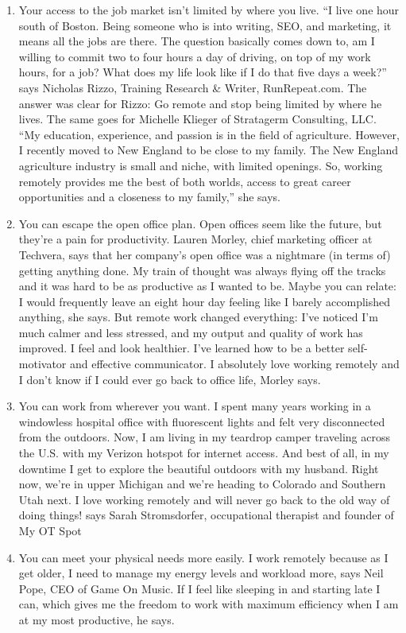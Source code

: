 \documentclass[]{book}
\begin{document}
\begin{enumerate}
\item
  Your access to the job market isn't limited by where you live. ``I live one hour south of Boston. Being someone who is into writing, SEO, and marketing, it means all the jobs are there. The question basically comes down to, am I willing to commit two to four hours a day of driving, on top of my work hours, for a job? What does my life look like if I do that five days a week?'' says Nicholas Rizzo, Training Research \& Writer, RunRepeat.com. The answer was clear for Rizzo: Go remote and stop being limited by where he lives. The same goes for Michelle Klieger of Stratagerm Consulting, LLC. ``My education, experience, and passion is in the field of agriculture. However, I recently moved to New England to be close to my family. The New England agriculture industry is small and niche, with limited openings. So, working remotely provides me the best of both worlds, access to great career opportunities and a closeness to my family,'' she says.
\item
  You can escape the open office plan. Open offices seem like the future, but they're a pain for productivity. Lauren Morley, chief marketing officer at Techvera, says that her company's open office was a nightmare (in terms of) getting anything done. My train of thought was always flying off the tracks and it was hard to be as productive as I wanted to be. Maybe you can relate: I would frequently leave an eight hour day feeling like I barely accomplished anything, she says. But remote work changed everything: I've noticed I'm much calmer and less stressed, and my output and quality of work has improved. I feel and look healthier. I've learned how to be a better self-motivator and effective communicator. I absolutely love working remotely and I don't know if I could ever go back to office life, Morley says.
\item
  You can work from wherever you want. I spent many years working in a windowless hospital office with fluorescent lights and felt very disconnected from the outdoors. Now, I am living in my teardrop camper traveling across the U.S. with my Verizon hotspot for internet access. And best of all, in my downtime I get to explore the beautiful outdoors with my husband. Right now, we're in upper Michigan and we're heading to Colorado and Southern Utah next. I love working remotely and will never go back to the old way of doing things! says Sarah Stromsdorfer, occupational therapist and founder of My OT Spot
\item
  You can meet your physical needs more easily. I work remotely because as I get older, I need to manage my energy levels and workload more, says Neil Pope, CEO of Game On Music. If I feel like sleeping in and starting late I can, which gives me the freedom to work with maximum efficiency when I am at my most productive, he says.

\end{enumerate}
\end{document}
